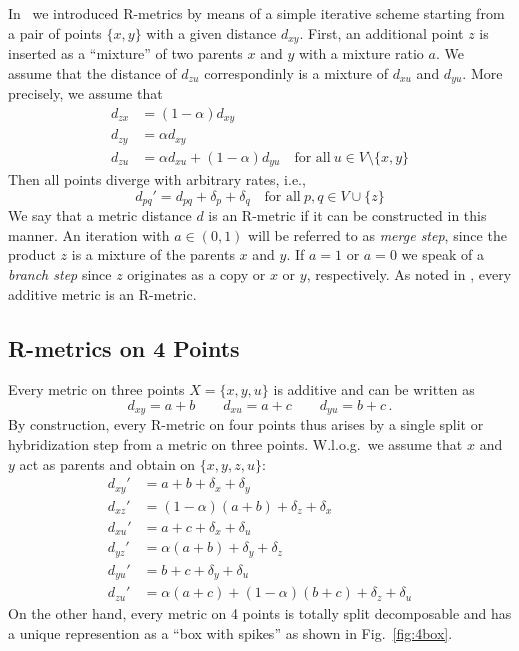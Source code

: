 \documentclass{article}
\begin{document}
In~\cite{Prohaska:17a} we introduced R-metrics by means of a simple
iterative scheme starting from a pair of points $\{x,y\}$ with a given
distance $d_{xy}$.  First, an additional point $z$ is inserted as a
``mixture'' of two parents $x$ and $y$ with a mixture ratio $a$. We assume
that the distance of $d_{zu}$ correspondinly is a mixture of $d_{xu}$ and
$d_{yu}$. More precisely, we assume that
\begin{equation} 
\begin{split} 
  d_{zx} & = (1-\alpha)  d_{xy} \\
  d_{zy} & =   \alpha    d_{xy} \\
  d_{zu} & =   \alpha    d_{xu} + (1-\alpha)  d_{yu} \quad\textrm{for all}\ 
                     u\in V\setminus\{ x,y \}
\end{split}
\end{equation} 
Then all points diverge with arbitrary rates, i.e., 
\begin{equation} 
  d_{pq}' = d_{pq} + \delta_p + \delta_q \quad\textrm{for all}\ 
  p,q \in V\cup\{z\} 
\end{equation} 
We say that a metric distance $d$ is an R-metric if it can be constructed
in this manner. An iteration with $a\in(0,1)$ will be referred to as
\emph{merge step}, since the product $z$ is a mixture of the parents $x$
and $y$. If $a=1$ or $a=0$ we speak of a \emph{branch step} since
$z$ originates as a copy or $x$ or $y$, respectively. As noted in
\cite{Prohaska:17a}, every additive metric is an R-metric.

\subsection{R-metrics on 4 Points}

Every metric on three points $X=\{x,y,u\}$ is additive and can be written as
\begin{equation}
  d_{xy}=a+b \qquad
  d_{xu}=a+c \qquad
  d_{yu}=b+c\,. 
\end{equation}
By construction, every R-metric on four points thus arises by a single
split or hybridization step from a metric on three points. W.l.o.g.\ we
assume that $x$ and $y$ act as parents and obtain on $\{x,y,z,u\}$:
\begin{equation} 
  \begin{split}
  d_{xy}' & = a + b + \delta_x + \delta_y \\  
  d_{xz}' & = (1-\alpha)(a+b) + \delta_z +\delta_x \\
  d_{xu}' & = a + c + \delta_x + \delta_u \\
  d_{yz}' & = \alpha (a+b) + \delta_y + \delta_z \\
  d_{yu}' & = b + c + \delta_y + \delta_u \\
  d_{zu}' & = \alpha (a+c) + (1-\alpha)(b+c) + \delta_z + \delta_u
\end{split}
\end{equation}
On the other hand, every metric on 4 points is totally split decomposable
and has a unique represention as a ``box with spikes'' as shown in
Fig.~\ref{fig:4box}.
\end{document}
